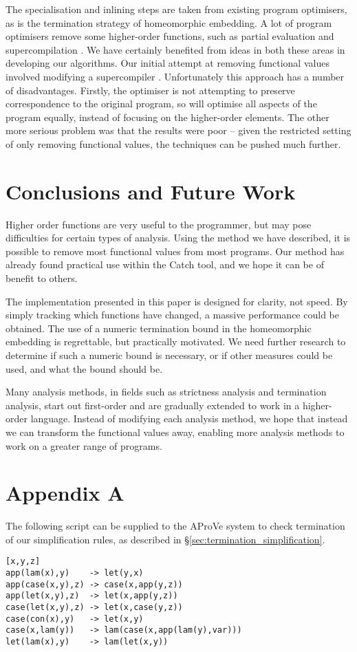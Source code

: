 \documentclass[preprint]{sigplanconf}
\begin{document}
The specialisation and inlining steps are taken from existing program optimisers, as is the termination strategy of homeomorphic embedding. A lot of program optimisers remove some higher-order functions, such as partial evaluation \cite{jones:partial_evaluation} and supercompilation \cite{supercompilation}. We have certainly benefited from ideas in both these areas in developing our algorithms. Our initial attempt at removing functional values involved modifying a supercompiler \cite{me:supero}. Unfortunately this approach has a number of disadvantages. Firstly, the optimiser is not attempting to preserve correspondence to the original program, so will optimise all aspects of the program equally, instead of focusing on the higher-order elements. The other more serious problem was that the results were poor -- given the restricted setting of only removing functional values, the techniques can be pushed much further.

\section{Conclusions and Future Work}
\label{sec:conclusion}

Higher order functions are very useful to the programmer, but may pose difficulties for certain types of analysis. Using the method we have described, it is possible to remove most functional values from most programs. Our method has already found practical use within the Catch tool, and we hope it can be of benefit to others.

The implementation presented in this paper is designed for clarity, not speed. By simply tracking which functions have changed, a massive performance could be obtained. The use of a numeric termination bound in the homeomorphic embedding is regrettable, but practically motivated. We need further research to determine if such a numeric bound is necessary, or if other measures could be used, and what the bound should be.

Many analysis methods, in fields such as strictness analysis and termination analysis, start out first-order and are gradually extended to work in a higher-order language. Instead of modifying each analysis method, we hope that instead we can transform the functional values away, enabling more analysis methods to work on a greater range of programs.

\section*{Appendix A}

The following script can be supplied to the AProVe system \cite{aprove} to check termination of our simplification rules, as described in \S\ref{sec:termination_simplification}.

\begin{verbatim}
[x,y,z]
app(lam(x),y)    -> let(y,x)
app(case(x,y),z) -> case(x,app(y,z))
app(let(x,y),z)  -> let(x,app(y,z))
case(let(x,y),z) -> let(x,case(y,z))
case(con(x),y)   -> let(x,y)
case(x,lam(y))   -> lam(case(x,app(lam(y),var)))
let(lam(x),y)    -> lam(let(x,y))
\end{verbatim}





\end{document}
